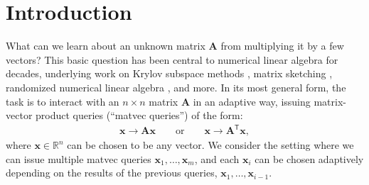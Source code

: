 \documentclass{article}[11pt]
\theoremstyle{definition}
\newcommand{\bv}[1]{\boldsymbol{\mathbf{#1}}}
\newcommand{\R}{\mathbb{R}}
\newcommand{\transpose}{\mathsf{T}}
\begin{document}
\vspace{1em}
\begin{center}
\end{center}

\thispagestyle{empty}
\newpage
\setcounter{page}{1}
\section{Introduction}
What can we learn about an unknown matrix $\bv{A}$ from multiplying it by a few vectors? This basic question has been central to numerical linear algebra for decades, underlying work on Krylov subspace methods \cite{Saad:2003,Saad:2011}, matrix sketching \cite{Woodruff:2014,DrineasMahoney:2016}, randomized numerical linear algebra \cite{WeisseWelleinAlvermann:2006,MartinssonTropp:2020}, and more. In its most general form, the task is to interact with an $n\times n$ matrix $\bv{A}$ in an adaptive way, issuing matrix-vector product queries (``matvec queries'') of the form:
\begin{align*}
    \bv{x} \rightarrow \bv{A}\bv{x} \hspace{2em} \text{or} \hspace{2em} \bv{x} \rightarrow \bv{A}^\transpose\bv{x},
\end{align*}
where $\bv{x}\in \R^{n}$ can be chosen to be any vector. We consider the setting where we can issue multiple matvec queries $\bv{x}_1, \ldots, \bv{x}_m$, and each $\bv{x}_{i}$ can be chosen {adaptively} depending on the results of the previous queries, $\bv{x}_1, \ldots, \bv{x}_{i-1}$.
\end{document}
